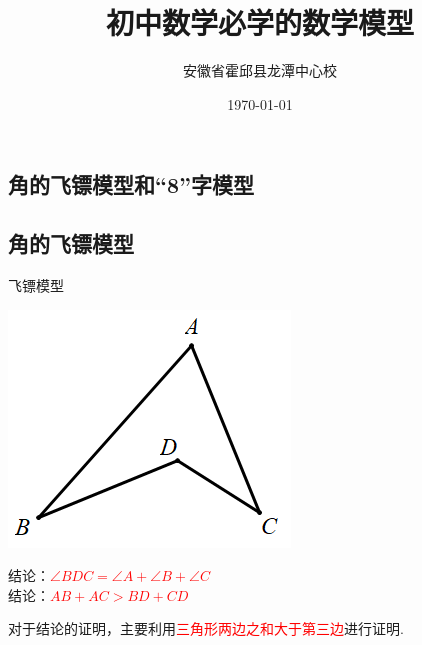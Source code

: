 \documentclass[10pt,twocolumn]{ctexart}
\title{初中数学必学的数学模型}
\author{安徽省霍邱县龙潭中心校}
\date{\today}
\begin{document}
\maketitle
\tableofcontents


\clearpage
\begin{strip}
\section{角的飞镖模型和“8”字模型}
\subsection{角的飞镖模型}

\begin{custom}[explorecolor]{飞镖模型}
\begin{minipage}{0.3\textwidth}
 \includegraphics[scale=0.3]{figure/feibiao01.PNG}
\end{minipage}
\begin{minipage}{0.6\textwidth}
结论：\textcolor{red}{$\angle BDC=\angle A+\angle B+\angle C$}\\
结论：\textcolor{red}{$AB+AC>BD+CD$}
\end{minipage}
\end{custom}
\end{strip}







对于结论的证明，主要利用\textcolor{red}{三角形两边之和大于第三边}进行证明.
\end{document}
